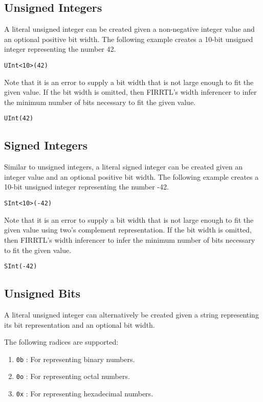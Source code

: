 \documentclass[12pt]{article}
\begin{document}
\subsection{Unsigned Integers}

A literal unsigned integer can be created given a non-negative integer value and an optional positive bit width. The following example creates a 10-bit unsigned integer representing the number 42. 
\begin{verbatim}
UInt<10>(42)
\end{verbatim}

Note that it is an error to supply a bit width that is not large enough to fit the given value. If the bit width is omitted, then FIRRTL's width inferencer to infer the minimum number of bits necessary to fit the given value.
\begin{verbatim}
UInt(42)
\end{verbatim}

\subsection{Signed Integers}

Similar to unsigned integers, a literal signed integer can be created given an integer value and an optional positive bit width. The following example creates a 10-bit unsigned integer representing the number -42. 
\begin{verbatim}
SInt<10>(-42)
\end{verbatim}

Note that it is an error to supply a bit width that is not large enough to fit the given value using two's complement representation. If the bit width is omitted, then FIRRTL's width inferencer to infer the minimum number of bits necessary to fit the given value.
\begin{verbatim}
SInt(-42)
\end{verbatim}

\subsection{Unsigned Bits}

A literal unsigned integer can alternatively be created given a string representing its bit representation and an optional bit width. 

The following radices are supported:
\begin{enumerate}
\item \verb|0b| : For representing binary numbers.
\item \verb|0o| : For representing octal numbers.
\item \verb|0x| : For representing hexadecimal numbers.
\end{enumerate}
\end{document}
